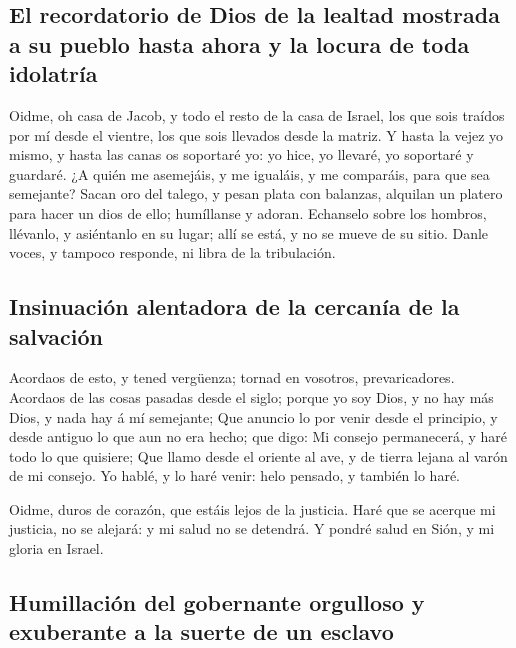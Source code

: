 \hypertarget{el-recordatorio-de-dios-de-la-lealtad-mostrada-a-su-pueblo-hasta-ahora-y-la-locura-de-toda-idolatruxeda}{%
\subsection{El recordatorio de Dios de la lealtad mostrada a su pueblo
hasta ahora y la locura de toda
idolatría}\label{el-recordatorio-de-dios-de-la-lealtad-mostrada-a-su-pueblo-hasta-ahora-y-la-locura-de-toda-idolatruxeda}}

 Oidme, oh casa de Jacob, y todo el resto de la casa de
Israel, los que sois traídos por mí desde el vientre, los que sois
llevados desde la matriz.  Y hasta la vejez yo mismo, y
hasta las canas os soportaré yo: yo hice, yo llevaré, yo soportaré y
guardaré.  ¿A quién me asemejáis, y me igualáis, y me
comparáis, para que sea semejante?  Sacan oro del talego, y
pesan plata con balanzas, alquilan un platero para hacer un dios de
ello; humíllanse y adoran.  Echanselo sobre los hombros,
llévanlo, y asiéntanlo en su lugar; allí se está, y no se mueve de su
sitio. Danle voces, y tampoco responde, ni libra de la tribulación.

\hypertarget{insinuaciuxf3n-alentadora-de-la-cercanuxeda-de-la-salvaciuxf3n}{%
\subsection{Insinuación alentadora de la cercanía de la
salvación}\label{insinuaciuxf3n-alentadora-de-la-cercanuxeda-de-la-salvaciuxf3n}}

 Acordaos de esto, y tened vergüenza; tornad en vosotros,
prevaricadores.  Acordaos de las cosas pasadas desde el
siglo; porque yo soy Dios, y no hay más Dios, y nada hay á mí semejante;
 Que anuncio lo por venir desde el principio, y desde
antiguo lo que aun no era hecho; que digo: Mi consejo permanecerá, y
haré todo lo que quisiere;  Que llamo desde el oriente al
ave, y de tierra lejana al varón de mi consejo. Yo hablé, y lo haré
venir: helo pensado, y también lo haré.

 Oidme, duros de corazón, que estáis lejos de la justicia.
 Haré que se acerque mi justicia, no se alejará: y mi salud
no se detendrá. Y pondré salud en Sión, y mi gloria en Israel.

\hypertarget{humillaciuxf3n-del-gobernante-orgulloso-y-exuberante-a-la-suerte-de-un-esclavo}{%
\subsection{Humillación del gobernante orgulloso y exuberante a la
suerte de un
esclavo}\label{humillaciuxf3n-del-gobernante-orgulloso-y-exuberante-a-la-suerte-de-un-esclavo}}

